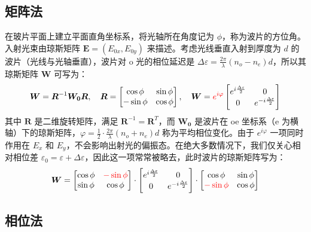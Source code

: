 \documentclass[UTF8]{report}
\theoremstyle{MyLineTheoremStyle} %
\theoremstyle{MyBlockTheoremStyle} %
\theoremstyle{MySubsubsectionStyle} %
\begin{document}
\subsection{矩阵法}
在玻片平面上建立平面直角坐标系，将光轴所在角度记为 $\phi$，称为波片的方位角。入射光束由琼斯矩阵 $\boldsymbol{E} = (E_{0x}, E_{0y})$ 来描述。考虑光线垂直入射到厚度为 $d$ 的波片（光线与光轴垂直），波片对 o 光的相位延迟是 $\Delta \varepsilon = \frac{2\pi}{\lambda}(n_o - n_e) d$，所以其琼斯矩阵 $\boldsymbol{W}$ 可写为：
\begin{equation}
\boldsymbol{W} = \boldsymbol{R}^{-1} \boldsymbol{W_0} \boldsymbol{R},\quad \boldsymbol{R} = 
\begin{bmatrix}
    \cos \phi & \sin \phi \\ 
    - \sin \phi & \cos \phi
\end{bmatrix},\quad \boldsymbol{W} =
{\color{red} e^{i\varphi}}\begin{bmatrix}
    e^{i\frac{\Delta \varepsilon}{2}} & 0 \\ 
    0 & e^{-i\frac{\Delta \varepsilon}{2}}
\end{bmatrix}
\end{equation}
其中 $\boldsymbol{R}$ 是二维旋转矩阵，满足 $\boldsymbol{R}^{-1} = \boldsymbol{R}^T$，而 $\boldsymbol{W_0}$ 是波片在 oe 坐标系（e 为横轴）下的琼斯矩阵，$\varphi = \frac{1}{2}\cdot \frac{2 \pi }{\lambda} (n_o + n_e) d$ 称为平均相位变化。由于 $e^{i\varphi}$ 一项同时作用在 $E_x$ 和 $E_y$，不会影响出射光的偏振态。在绝大多数情况下，我们仅关心相对相位差 $\varepsilon_0 =  \varepsilon + \Delta \varepsilon$，因此这一项常常被略去，此时波片的琼斯矩阵写为：
\begin{equation}
    \boldsymbol{W} = 
    \begin{bmatrix}
        \cos \phi & {\color{red} - \sin \phi } \\ 
         \sin \phi & \cos \phi
    \end{bmatrix}\cdot 
    \begin{bmatrix}
        e^{i\frac{\Delta \varepsilon}{2}} & 0 \\ 
        0 & e^{-i\frac{\Delta \varepsilon}{2}}
    \end{bmatrix}
    \cdot
    \begin{bmatrix}
        \cos \phi & \sin \phi \\ 
        {\color{red} - \sin  \phi} & \cos \phi
    \end{bmatrix}
\end{equation}

\subsection{相位法}
\end{document}
